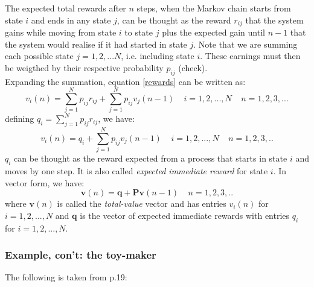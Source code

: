 \documentclass[\main/main.tex]{subfiles}
\begin{document}
\noindent The expected total rewards after $n$ steps, when the Markov chain starts from state $i$ and ends in any state $j$, can be thought as the reward $r_{ij}$ that the system gains while moving from state $i$ to state $j$ plus the expected gain until $n-1$ that the system would realise if it had started in state $j$. Note that we are summing each possible state $j = 1,2, ...N$, i.e. including state $i$. These earnings must then be weigthed by their respective probability $p_{ij}$ (check).\\

\noindent Expanding the summation, equation \ref{rewards} can be written as:
\begin{equation}
   v_i(n) = \sum_{j=1}^N p_{ij}r_{ij} +  \sum_{j=1}^N p_{ij}v_j(n-1) \;\;\;\; i=1,2,...,N \;\;\;\; n=1,2,3,...
\end{equation}
defining $q_i =  \sum_{j=1}^N p_{ij}r_{ij}$, we have:
\begin{equation}
   v_i(n) = q_i +  \sum_{j=1}^N p_{ij}v_j(n-1) \;\;\;\; i=1,2,...,N \;\;\;\; n=1,2,3,..
\end{equation}
$q_i$ can be thought as the reward expected from a process that starts in state $i$ and moves by one step. It is also called \textit{expected immediate reward} for state $i$. 
In vector form, we have:
\begin{equation}
   \mathbf{v}(n) = \mathbf{q} +  \mathbf{P}\mathbf{v}(n-1)\;\;\;\; n=1,2,3,..
\end{equation}
where $ \mathbf{v}(n)$ is called the \textit{total-value} vector and has entries $ v_i(n)$ for $i=1,2,...,N$ and $ \mathbf{q}$ is the vector of expected immediate rewards with entries $q_i$   for $i=1,2,...,N$.



\subsubsection{Example, con't: the toy-maker \citep{Howard1960}}

The following is taken from \cite{Howard1960} p.19:
\end{document}

